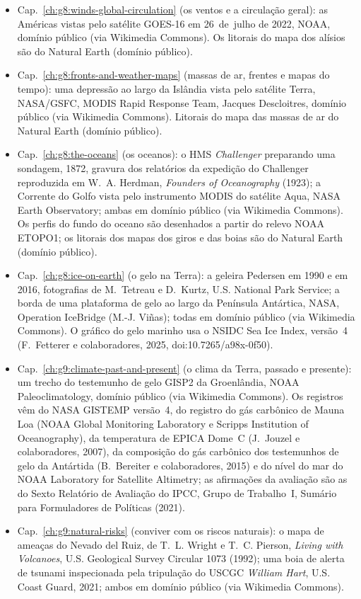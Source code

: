 \begin{itemize}
  \item Cap.~\ref{ch:g8:winds-global-circulation} (os ventos e a circulação geral): as Américas vistas pelo satélite GOES-16 em 26~de~julho de 2022, NOAA, domínio público (via Wikimedia Commons). Os litorais do mapa dos alísios são do Natural Earth (domínio público).
  \item Cap.~\ref{ch:g8:fronts-and-weather-maps} (massas de ar, frentes e mapas do tempo): uma depressão ao largo da Islândia vista pelo satélite Terra, NASA/GSFC, MODIS Rapid Response Team, Jacques Descloitres, domínio público (via Wikimedia Commons). Litorais do mapa das massas de ar do Natural Earth (domínio público).
  \item Cap.~\ref{ch:g8:the-oceans} (os oceanos): o HMS \emph{Challenger} preparando uma sondagem, 1872, gravura dos relatórios da expedição do Challenger reproduzida em W.~A. Herdman, \emph{Founders of Oceanography} (1923); a Corrente do Golfo vista pelo instrumento MODIS do satélite Aqua, NASA Earth Observatory; ambas em domínio público (via Wikimedia Commons). Os perfis do fundo do oceano são desenhados a partir do relevo NOAA ETOPO1; os litorais dos mapas dos giros e das boias são do Natural Earth (domínio público).
  \item Cap.~\ref{ch:g8:ice-on-earth} (o gelo na Terra): a geleira Pedersen em 1990 e em 2016, fotografias de M.~Tetreau e D.~Kurtz, U.S. National Park Service; a borda de uma plataforma de gelo ao largo da Península Antártica, NASA, Operation IceBridge (M.-J. Viñas); todas em domínio público (via Wikimedia Commons). O gráfico do gelo marinho usa o NSIDC Sea Ice Index, versão~4 (F.~Fetterer e colaboradores, 2025, doi:10.7265/a98x-0f50).
  \item Cap.~\ref{ch:g9:climate-past-and-present} (o clima da Terra, passado e presente): um trecho do testemunho de gelo GISP2 da Groenlândia, NOAA Paleoclimatology, domínio público (via Wikimedia Commons). Os registros vêm do NASA GISTEMP versão~4, do registro do gás carbônico de Mauna Loa (NOAA Global Monitoring Laboratory e Scripps Institution of Oceanography), da temperatura de EPICA Dome~C (J.~Jouzel e colaboradores, 2007), da composição do gás carbônico dos testemunhos de gelo da Antártida (B.~Bereiter e colaboradores, 2015) e do nível do mar do NOAA Laboratory for Satellite Altimetry; as afirmações da avaliação são as do Sexto Relatório de Avaliação do IPCC, Grupo de Trabalho~I, Sumário para Formuladores de Políticas (2021).
  \item Cap.~\ref{ch:g9:natural-risks} (conviver com os riscos naturais): o mapa de ameaças do Nevado del Ruiz, de T.~L. Wright e T.~C. Pierson, \emph{Living with Volcanoes}, U.S. Geological Survey Circular 1073 (1992); uma boia de alerta de tsunami inspecionada pela tripulação do USCGC \emph{William Hart}, U.S. Coast Guard, 2021; ambos em domínio público (via Wikimedia Commons).

\end{itemize}
